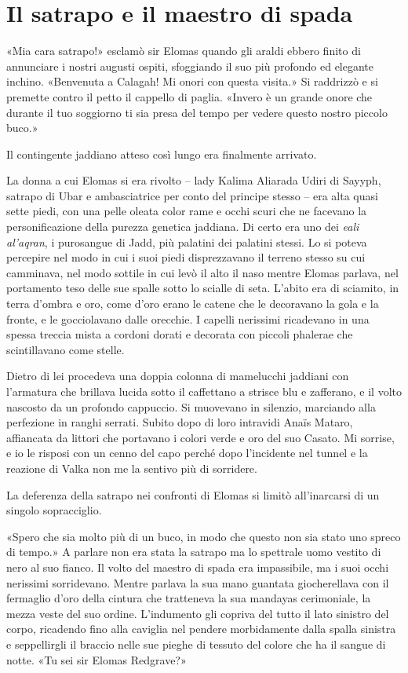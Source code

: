 \chapter{Il satrapo e il maestro di spada}

«Mia cara satrapo!» esclamò sir Elomas quando gli araldi ebbero finito
di annunciare i nostri augusti ospiti, sfoggiando il suo più profondo ed
elegante inchino. «Benvenuta a Calagah! Mi onori con questa visita.» Si
raddrizzò e si premette contro il petto il cappello di paglia. «Invero è
un grande onore che durante il tuo soggiorno ti sia presa del tempo per
vedere questo nostro piccolo buco.»

Il contingente jaddiano atteso così lungo era finalmente arrivato.

La donna a cui Elomas si era rivolto -- lady Kalima Aliarada Udiri di
Sayyph, satrapo di Ubar e ambasciatrice per conto del principe stesso --
era alta quasi sette piedi, con una pelle oleata color rame e occhi
scuri che ne facevano la personificazione della purezza genetica
jaddiana. Di certo era uno dei \emph{eali al'aqran}, i purosangue di
Jadd, più palatini dei palatini stessi. Lo si poteva percepire nel modo
in cui i suoi piedi disprezzavano il terreno stesso su cui camminava,
nel modo sottile in cui levò il alto il naso mentre Elomas parlava, nel
portamento teso delle sue spalle sotto lo scialle di seta. L'abito era
di sciamito, in terra d'ombra e oro, come d'oro erano le catene che le
decoravano la gola e la fronte, e le gocciolavano dalle orecchie. I
capelli nerissimi ricadevano in una spessa treccia mista a cordoni
dorati e decorata con piccoli phalerae che scintillavano come stelle.

Dietro di lei procedeva una doppia colonna di mamelucchi jaddiani con
l'armatura che brillava lucida sotto il caffettano a strisce blu e
zafferano, e il volto nascosto da un profondo cappuccio. Si muovevano in
silenzio, marciando alla perfezione in ranghi serrati. Subito dopo di
loro intravidi Anaïs Mataro, affiancata da littori che portavano i
colori verde e oro del suo Casato. Mi sorrise, e io le risposi con un
cenno del capo perché dopo l'incidente nel tunnel e la reazione di Valka
non me la sentivo più di sorridere.

La deferenza della satrapo nei confronti di Elomas si limitò
all'inarcarsi di un singolo sopracciglio.

«Spero che sia molto più di un buco, in modo che questo non sia stato
uno spreco di tempo.» A parlare non era stata la satrapo ma lo spettrale
uomo vestito di nero al suo fianco. Il volto del maestro di spada era
impassibile, ma i suoi occhi nerissimi sorridevano. Mentre parlava la
sua mano guantata giocherellava con il fermaglio d'oro della cintura che
tratteneva la sua mandayas cerimoniale, la mezza veste del suo ordine.
L'indumento gli copriva del tutto il lato sinistro del corpo, ricadendo
fino alla caviglia nel pendere morbidamente dalla spalla sinistra e
seppellirgli il braccio nelle sue pieghe di tessuto del colore che ha il
sangue di notte. «Tu sei sir Elomas Redgrave?»

